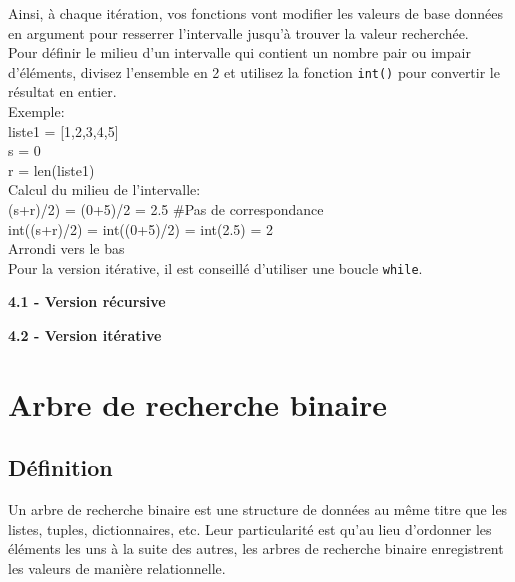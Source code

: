 \begin{Exercice}[20 minutes]
\begin{conseil}
            Ainsi, à chaque itération, vos fonctions vont modifier les valeurs de base données en argument pour resserrer l'intervalle jusqu'à trouver la valeur recherchée.\\        
            Pour définir le milieu d'un intervalle qui contient un nombre pair ou impair d'éléments, divisez l'ensemble en 2 et utilisez la fonction \lstinline{int()} pour convertir le résultat en entier. \\
            Exemple:\\
                liste1 = [1,2,3,4,5]\\
                s = 0\\
                r = len(liste1)\\
                Calcul du milieu de l'intervalle:\\
                (s+r)/2) = (0+5)/2 = 2.5 \#Pas de correspondance\\
                int((s+r)/2) = int((0+5)/2) = int(2.5) = 2 \\
                Arrondi vers le bas
            \\
            
            Pour la version itérative, il est conseillé d'utiliser une boucle \lstinline{while}.
    
        \end{conseil}
    
        \begin{solution}
            \textbf{4.1 - Version récursive}
            
        \end{solution}
        \begin{solution}
            \textbf{4.2 - Version itérative}
            
        \end{solution}
    
    \end{Exercice}
    
       
    \newpage
    \section{Arbre de recherche binaire}
    \subsection{Définition}
    
    Un arbre de recherche binaire est une structure de données au même titre que les listes, tuples, dictionnaires, etc. Leur particularité est qu'au lieu d'ordonner les éléments les uns à la suite des autres, les arbres de recherche binaire enregistrent les valeurs de manière relationnelle.\\
    
